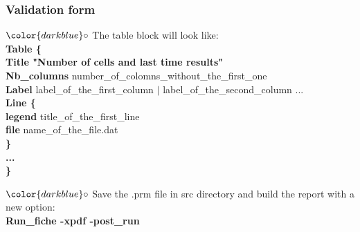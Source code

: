 \documentclass[10pt, hyperref={unicode=true,pdfusetitle, bookmarks=true,bookmarksnumbered=false,bookmarksopen=false, breaklinks=false,pdfborder={0 0 1},backref=true,colorlinks=true,linkcolor=darkblue,pageanchor}]{beamer}
\begin{document}
\begin{frame}
\frametitle{Validation form}
\begin{block}{}

\hspace{1cm} $\color{darkblue}\circ$ {\small{ The table block will look like:\\
{\footnotesize{
\hspace{1.4cm} \textbf{Table \{} \\
\hspace{1.7cm} \textbf{Title "Number of cells and last time results"} \\
\hspace{1.7cm} \textbf{Nb\_columns} number\_of\_colomns\_without\_the\_first\_one \\
\hspace{1.7cm} \textbf{Label} label\_of\_the\_first\_column $|$ label\_of\_the\_second\_column ...\\
\hspace{1.7cm} \textbf{Line \{} \\
\hspace{2cm} \textbf{legend} title\_of\_the\_first\_line\\
\hspace{2cm} \textbf{file} name\_of\_the\_file.dat\\
\hspace{1.7cm} \textbf{\}} \\
\hspace{1.7cm} \textbf{...} \\
\hspace{1.4cm} \textbf{\}} \\
}}
}}

\hspace{1cm} $\color{darkblue}\circ$ {\small{ Save the .prm file in src directory and build the report with a new option:\\
\hspace{1.4cm} \textbf{Run\_fiche -xpdf -post\_run}
}}

\end{block}
\end{frame}
\end{document}
